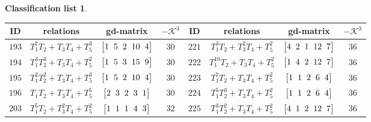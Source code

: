 \documentclass[10pt,a4paper]{amsart}
\theoremstyle{definition}
\newtheorem{class-list}[thm]{Classification list}
\numberwithin{equation}{section}
\begin{document}
\begin{class-list}
\begin{table}[t!]\centering\setlength{\tabcolsep}{2.5pt}
\renewcommand{\arraystretch}{1.25}\small\tabulinesep=1mm
\begin{tabu}{c|c|c|c||c|c|c|c}
\hline
ID&relations&gd-matrix&$-\mathcal{K}^3$&ID&relations&gd-matrix&$-\mathcal{K}^3$
\\ \hline
${193}$&${T_{1}^{7}T_{2}+T_{3}T_{4}+T_{5}^{3}}$
&$\arraycolsep=1mm\begin{bmatrix}{1} & {5} & {2} & {10} & {4}\end{bmatrix}$&${30}$
&${221}$&${T_{1}^{3}T_{2}+T_{3}^{2}T_{4}+T_{5}^{2}}$
&$\arraycolsep=1mm\begin{bmatrix}{4} & {2} & {1} & {12} & {7}\end{bmatrix}$&${36}$
\\ \hline
${194}$&${T_{1}^{3}T_{2}^{3}+T_{3}T_{4}+T_{5}^{2}}$
&$\arraycolsep=1mm\begin{bmatrix}{1} & {5} & {3} & {15} & {9}\end{bmatrix}$&${30}$
&${222}$&${T_{1}^{10}T_{2}+T_{3}T_{4}+T_{5}^{2}}$
&$\arraycolsep=1mm\begin{bmatrix}{1} & {4} & {2} & {12} & {7}\end{bmatrix}$&${36}$
\\ \hline
${195}$&${T_{1}^{2}T_{2}^{2}+T_{3}T_{4}+T_{5}^{3}}$
&$\arraycolsep=1mm\begin{bmatrix}{1} & {5} & {2} & {10} & {4}\end{bmatrix}$&${30}$
&${223}$&${T_{1}^{7}T_{2}+T_{3}T_{4}+T_{5}^{2}}$
&$\arraycolsep=1mm\begin{bmatrix}{1} & {1} & {2} & {6} & {4}\end{bmatrix}$&${36}$
\\ \hline
${196}$&${T_{1}T_{2}+T_{3}T_{4}+T_{5}^{5}}$
&$\arraycolsep=1mm\begin{bmatrix}{2} & {3} & {2} & {3} & {1}\end{bmatrix}$&${30}$
&${224}$&${T_{1}^{5}T_{2}^{3}+T_{3}T_{4}+T_{5}^{2}}$
&$\arraycolsep=1mm\begin{bmatrix}{1} & {1} & {2} & {6} & {4}\end{bmatrix}$&${36}$
\\ \hline
${203}$&${T_{1}^{5}T_{2}+T_{3}^{2}T_{4}+T_{5}^{2}}$
&$\arraycolsep=1mm\begin{bmatrix}{1} & {1} & {1} & {4} & {3}\end{bmatrix}$&${32}$
&${225}$&${T_{1}^{3}T_{2}^{2}+T_{3}T_{4}+T_{5}^{2}}$
&$\arraycolsep=1mm\begin{bmatrix}{4} & {1} & {2} & {12} & {7}\end{bmatrix}$&${36}$

\end{tabu}
\end{table}
\end{class-list}
\end{document}
